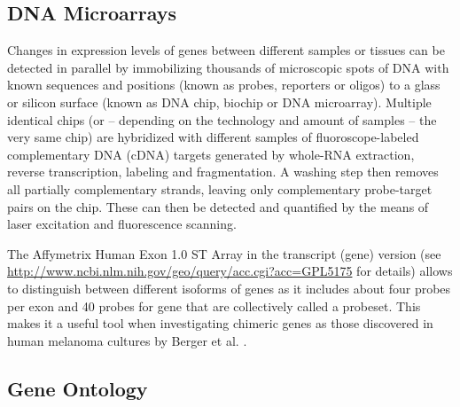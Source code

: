   \subsection{DNA Microarrays}
  \label{sec:microarrays}
  
  
  Changes in expression levels of genes between different samples or tissues can
be detected in parallel by immobilizing thousands of microscopic spots of DNA
with known sequences and positions (known as probes, reporters or oligos) to a
glass or silicon surface (known as DNA chip, biochip or DNA microarray).
Multiple identical chips (or -- depending on the technology and amount of
samples -- the very same chip) are hybridized with different samples of
fluoroscope-labeled complementary DNA (cDNA) targets generated by whole-RNA
extraction, reverse transcription, labeling and fragmentation. A washing step
then removes all partially complementary strands, leaving only complementary
probe-target pairs on the chip. These can then be detected and quantified by the
means of laser excitation and fluorescence scanning.
  
  The Affymetrix Human Exon 1.0 ST Array in the transcript (gene) version (see
\url{http://www.ncbi.nlm.nih.gov/geo/query/acc.cgi?acc=GPL5175} for details)
allows to distinguish between different isoforms of genes as it includes about
four probes per exon and 40 probes for gene that are collectively called a
probeset. This makes it a useful tool when investigating chimeric genes as those
discovered in human melanoma cultures by Berger et al. \cite{Berger2010}.

  
  
  \subsection{Gene Ontology}
  \label{sec:go}
  
